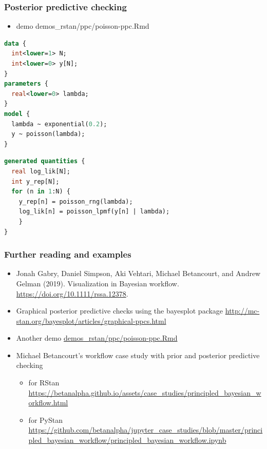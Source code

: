 \documentclass[10pt,handout]{beamer}
\begin{document}
\begin{frame}[fragile]

\frametitle{Posterior predictive checking}

  \vspace{-0.2\parskip}
  \begin{itemize}
  \item demo demos\_rstan/ppc/poisson-ppc.Rmd
  \end{itemize}

  \vspace{-0.2\parskip}
  {\color{gray}\footnotesize
\begin{lstlisting}[language=Stan]
data {
  int<lower=1> N;
  int<lower=0> y[N];
}
parameters {
  real<lower=0> lambda;
}
model {
  lambda ~ exponential(0.2);
  y ~ poisson(lambda);
}
\end{lstlisting}
  }
  \vspace{-\parskip}
  {\footnotesize
\begin{lstlisting}[language=Stan]
generated quantities {
  real log_lik[N];
  int y_rep[N];
  for (n in 1:N) {
    y_rep[n] = poisson_rng(lambda);
    log_lik[n] = poisson_lpmf(y[n] | lambda);
    }
}
\end{lstlisting}
 }
\end{frame}


\begin{frame}

\frametitle{Further reading and examples}

  \begin{itemize}
  \item Jonah Gabry, Daniel Simpson, Aki Vehtari, Michael
    Betancourt, and Andrew Gelman (2019). Visualization in Bayesian
    workflow. \url{https://doi.org/10.1111/rssa.12378}.
  \item Graphical posterior predictive checks using the bayesplot package
    \url{http://mc-stan.org/bayesplot/articles/graphical-ppcs.html}
  \item Another demo \href{http://avehtari.github.io/BDA_R_demos/demos_rstan/ppc/poisson-ppc.html}{demos\_rstan/ppc/poisson-ppc.Rmd}
  \item Michael Betancourt's workflow case study with prior and posterior predictive checking
    \begin{itemize}
    \item for RStan \url{https://betanalpha.github.io/assets/case_studies/principled_bayesian_workflow.html}
    \item for PyStan \url{https://github.com/betanalpha/jupyter_case_studies/blob/master/principled_bayesian_workflow/principled_bayesian_workflow.ipynb}
    \end{itemize}
  \end{itemize}

\end{frame}

\end{document}
